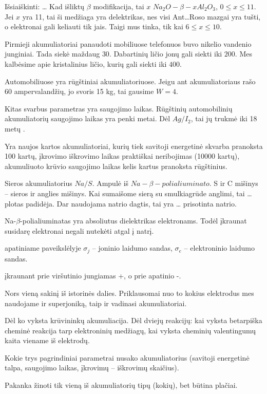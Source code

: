 Išsiaiškinti:
…
Kad išliktų $\beta$ modifikacija, tai $x$ $Na_{2}O-\beta-x Al_{2}O_{3}$,
$0 \leq x \leq 11$. Jei $x$ yra 11, tai ši medžiaga yra delektrikas,
nes visi Ant…Roso mazgai yra tušti, o elektronai gali keliauti tik
jais. Taigi mus tinka, tik kai $6 \leq x \leq 10$.

Pirmieji akumuliatoriai panaudoti mobiliuose telefonuos buvo nikelio
vandenio junginiai. Tada siekė maždaug $30$. Dabartinių ličio
jonų gali siekti iki $200$. Mes kalbėsime apie kristalinius
ličio, kurių gali siekti iki $400$.

Automobiliuose yra rūgštiniai akumuliatoriuose. Jeigu ant akumuliatoriaus
rašo 60 ampervalandžių, jo svoris 15 kg, tai gausime $W=4$.

Kitas svarbus parametras yra saugojimo laikas. Rūgštinių automobilinių
akumuliatorių saugojimo laikas yra penki metai. Dėl $Ag/I_{2}$, tai
jų trukmė iki 18 metų .

Yra naujos kartos akumuliatoriai, kurių tiek savitoji energetinė
skvarba pranoksta 100 kartų, įkrovimo iškrovimo laikas praktiškai
neribojimas (10000 kartų), akumuliuoto krūvio saugojimo laikas
kelis kartus pranoksta rūgštinius.

Sieros akumuliatorius  $Na/S$. Ampulė iš
$Na-\beta-polialiuminato$. S ir C mišinys – sieros ir anglies mišinys.
Kai sumaišome sierą su smulkiagrūde anglimi, tai … plotas padidėja.
Dar naudojama natrio dagtis, tai yra … prisotinta natrio.

Na-$\beta$-polialiuminatas yra absoliutus dielektrikas elektronams.
Todėl įkraunat susidarę elektronai negali nutekėti atgal į natrį.

 apatiniame paveikslėlyje $\sigma_{j}$ – joninio laidumo
sandas, $\sigma_{e}$ – elektroninio laidumo sandas.

 įkraunant prie viršutinio jungiamas +, o prie apatinio
-.

\begin{remember}
  \item Nors vieną sakinį iš istorinės dalies. Priklausomai nuo to
    kokius elektrodus mes naudojame ir superjoniką, taip ir vadinasi
    akumuliatoriai.
  \item Dėl ko vyksta krūvininkų akumuliacija. Dėl dviejų reakcijų:
    kai vyksta betarpiška cheminė reakcija tarp elektroninių medžiagų,
    kai vyksta cheminių valentingumų kaita viename iš elektrodų.
  \item Kokie trys pagrindiniai parametrai nusako akumuliatorius
    (savitoji energetinė talpa, saugojimo laikas, įkrovimų – iškrovimų
    skaičius).
  \item Pakanka žinoti tik vieną iš akumuliatorių tipų (kokių),
    bet būtina plačiai.
\end{remember}

